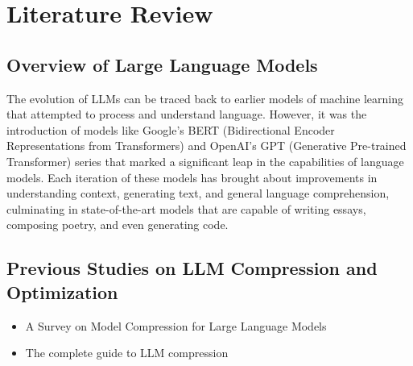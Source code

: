 \chapter{Literature Review}

\section{Overview of Large Language Models}
    The evolution of LLMs can be traced back to earlier models of machine learning that attempted to process and understand language. However, it was the introduction of models like Google's BERT (Bidirectional Encoder Representations from Transformers) and OpenAI's GPT (Generative Pre-trained Transformer) series that marked a significant leap in the capabilities of language models. Each iteration of these models has brought about improvements in understanding context, generating text, and general language comprehension, culminating in state-of-the-art models that are capable of writing essays, composing poetry, and even generating code.


\section{Previous Studies on LLM Compression and Optimization}

    \begin{itemize}
        \item A Survey on Model Compression for Large Language Models
        \item The complete guide to LLM compression
    \end{itemize}